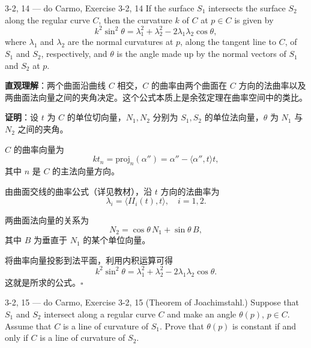 \begin{exercise}{3-2, 14 — do Carmo, Exercise 3-2, 14}
If the surface $S_{1}$ intersects the surface $S_{2}$ along the regular curve $C$, then the curvature $k$ of $C$ at $p \in C$ is given by
\[
k ^ {2} \sin^ {2} \theta = \lambda_ {1} ^ {2} + \lambda_ {2} ^ {2} - 2 \lambda_ {1} \lambda_ {2} \cos \theta,
\]
where $\lambda_{1}$ and $\lambda_{2}$ are the normal curvatures at $p$, along the tangent line to $C$, of $S_{1}$ and $S_{2}$, respectively, and $\theta$ is the angle made up by the normal vectors of $S_{1}$ and $S_{2}$ at $p$.
\end{exercise}

\begin{solution}
\textbf{直观理解}：两个曲面沿曲线 $C$ 相交，$C$ 的曲率由两个曲面在 $C$ 方向的法曲率以及两曲面法向量之间的夹角决定。这个公式本质上是余弦定理在曲率空间中的类比。

\textbf{证明}：设 $t$ 为 $C$ 的单位切向量，$N_1, N_2$ 分别为 $S_1, S_2$ 的单位法向量，$\theta$ 为 $N_1$ 与 $N_2$ 之间的夹角。

$C$ 的曲率向量为
\[
k t_n = \text{proj}_{n} (\alpha'') = \alpha'' - \langle \alpha'', t \rangle t,
\]
其中 $n$ 是 $C$ 的主法向量方向。

由曲面交线的曲率公式（详见教材），沿 $t$ 方向的法曲率为
\[
\lambda_i = \langle II_i(t), t \rangle, \quad i = 1, 2.
\]

两曲面法向量的关系为
\[
N_2 = \cos\theta \, N_1 + \sin\theta \, B,
\]
其中 $B$ 为垂直于 $N_1$ 的某个单位向量。

将曲率向量投影到法平面，利用内积运算可得
\[
k^2 \sin^2\theta = \lambda_1^2 + \lambda_2^2 - 2\lambda_1\lambda_2\cos\theta.
\]
这就是所求的公式。$\square$
\end{solution}

\begin{exercise}{3-2, 15 — do Carmo, Exercise 3-2, 15}
(Theorem of Joachimstahl.) Suppose that $S_{1}$ and $S_{2}$ intersect along a regular curve $C$ and make an angle $\theta(p)$, $p \in C$. Assume that $C$ is a line of curvature of $S_{1}$. Prove that $\theta(p)$ is constant if and only if $C$ is a line of curvature of $S_{2}$.
\end{exercise}

